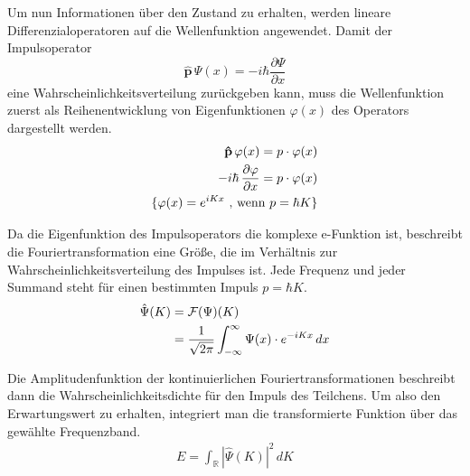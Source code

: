 Um nun Informationen über den Zustand zu erhalten, werden lineare Differenzialoperatoren auf die Wellenfunktion angewendet. Damit der Impulsoperator $$ \mathbf{\hat{p}} \, \Psi(x) = - i \hbar \frac{\partial \Psi}{\partial x} $$ eine Wahrscheinlichkeitsverteilung zurückgeben kann, muss die Wellenfunktion zuerst als Reihenentwicklung von Eigenfunktionen $\varphi(x)$ des Operators dargestellt werden.
\begin{align}
  \mathbf{\hat{p}} \, \varphi(x) = p \cdot \varphi(x) \notag \\
  - i \hbar \, \frac{\partial \varphi}{\partial x} = p \cdot \varphi(x) \notag\\
  \{ \varphi(x) = e^{i K x} \text{ , wenn  } p = \hbar K \}
\end{align}

Da die Eigenfunktion des Impulsoperators die komplexe e-Funktion ist, beschreibt die Fouriertransformation eine Grö\ss e, die im Verhältnis zur Wahrscheinlichkeitsverteilung des Impulses ist. Jede Frequenz und jeder Summand steht für einen bestimmten Impuls $ p = \hbar K $.
\begin{align}
  \hat{\Psi}(K) &= \mathcal{F}(\Psi)(K) \notag \\
                &= \frac{1}{\sqrt{2 \pi}} \int_{-\infty}^{\infty} \Psi(x) \cdot e^{-i K x} \, dx
\end{align}

Die Amplitudenfunktion der kontinuierlichen Fouriertransformationen beschreibt dann die Wahrscheinlichkeitsdichte für den Impuls des Teilchens. Um also den Erwartungswert zu erhalten, integriert man die transformierte Funktion über das gewählte Frequenzband.
\begin{align}
  E = \int_{\mathbb{R}} | \hat{\Psi}(K) |^2 \, dK
\end{align}
